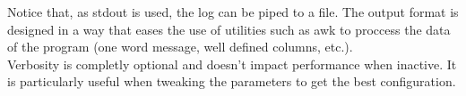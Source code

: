   Notice that, as stdout is used, the log can be piped to a file. The
  output format is designed in a way that eases the use of utilities such as
  awk to proccess the data of the program (one word message, well defined
  columns, etc.).\\

  Verbosity is completly optional and doesn't impact performance when inactive.
  It is particularly useful when tweaking the parameters to get the best
  configuration.\\
